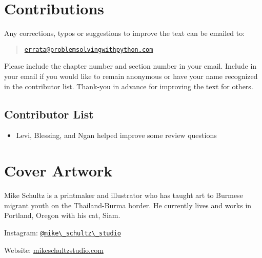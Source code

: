 \documentclass{book}
\providecommand{\tightlist}{%
      \setlength{\itemsep}{0pt}\setlength{\parskip}{0pt}}
\newcommand{\passthrough}[1]{#1}
\begin{document}
    
        \hypertarget{contributions}{%
\section{Contributions}\label{contributions}}
    




    
        Any corrections, typos or suggestions to improve the text can be emailed
to:

\begin{quote}
\href{mailto:errata@problemsolvingwithpython.com}{\nolinkurl{errata@problemsolvingwithpython.com}}
\end{quote}

Please include the chapter number and section number in your email.
Include in your email if you would like to remain anonymous or have your
name recognized in the contributor list. Thank-you in advance for
improving the text for others.
    




    
        \hypertarget{contributor-list}{%
\subsection{Contributor List}\label{contributor-list}}

\begin{itemize}
\tightlist
\item
  Levi, Blessing, and Ngan helped improve some review questions
\end{itemize}
    




    
        \hypertarget{cover-artwork}{%
\section{Cover Artwork}\label{cover-artwork}}
    




    
        Mike Schultz is a printmaker and illustrator who has taught art to
Burmese migrant youth on the Thailand-Burma border. He currently lives
and works in Portland, Oregon with his cat, Siam.

Instagram:
\href{https://www.instagram.com/mike_schultz_studio/}{\passthrough{\lstinline!@mike\_schultz\_studio!}}

Website:
\href{http://mikeschultzstudio.squarespace.com/}{mikeschultzstudio.com}
    
\end{document}

